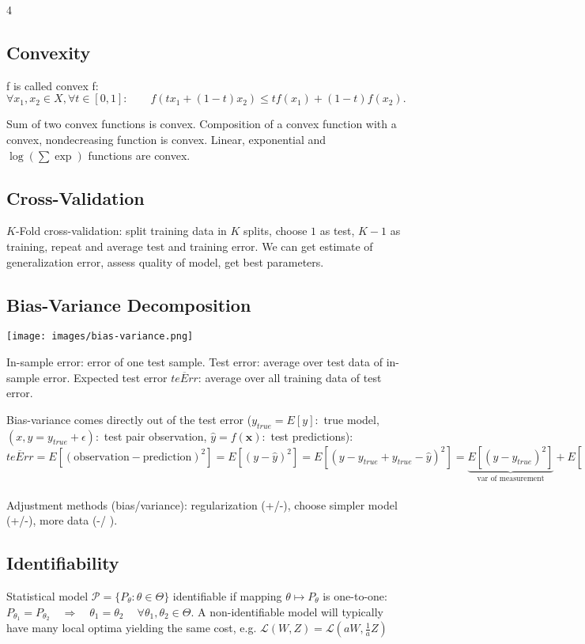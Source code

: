 \documentclass[10pt,a4paper,landscape]{extarticle}
\renewcommand{\bf}[1]{\ensuremath{\mathbf{#1}}}
\begin{document}
\begin{multicols*}{4}
\subsection{Convexity}
f is called convex f: $\forall x_1, x_2 \in X, \forall t \in [0, 1]: \qquad f(tx_1+(1-t)x_2)\leq t f(x_1)+(1-t)f(x_2).$

Sum of two convex functions is convex. Composition of a convex function with a convex, nondecreasing function is convex. Linear, exponential and $\log(\sum \exp)$ functions are convex.

\subsection{Cross-Validation}
$K$-Fold cross-validation: split training data in $K$ splits, choose $1$ as test, $K-1$ as training, repeat and average test and training error. We can get estimate of generalization error, assess quality of model, get best parameters.

\subsection{Bias-Variance Decomposition}
\begin{colfig}
  \centering
  \texttt{[image: images/bias-variance.png]}
\end{colfig}

In-sample error: error of one test sample. Test error: average over test data of in-sample error. Expected test error $\overline{teErr}$: average over all training data of test error. 

Bias-variance comes directly out of the test error ($y_{true}=E[y]:$ true model, $(x,y = y_{true} + \epsilon):$ test pair observation, $\hat{y}=f(\bf{x}):$ test predictions):
$\overline{teErr} 
= E[(\text{observation} - \text{prediction})^2] = E[(y - \hat{y})^2]
= E[(y - y_{true} + y_{true} - \hat{y})^2]
=\underbrace{E[(y - y_{true})^2]}_{\text{var of measurement}} + E[(y_{true} - \hat{y})^2]
=\sigma^2 + E[(y_{true} - E[\hat{y}] + E[\hat{y}] - \hat{y})^2]
=\sigma^2 + \underbrace{E[(y_{true} - E[\hat{y}])^2]}_{\text{pred bias}^2} +\underbrace{E[(E[\hat{y}] - \hat{y})^2]}_{\text{pred variance}}
$

Adjustment methods (bias/variance): regularization (+/-), choose simpler model (+/-), more data (-/ ).

\subsection{Identifiability}
Statistical model $\mathcal{P} = \{P_\theta: \theta \in \Theta\}$ identifiable if mapping $\theta \mapsto P_\theta$ is one-to-one:
$P_{\theta_1}=P_{\theta_2} \quad\Rightarrow\quad \theta_1=\theta_2 \quad\ \forall \theta_1,\theta_2\in\Theta.$
A non-identifiable model will typically have many local optima yielding the same cost, e.g. $\mathcal{L}(W, Z) = \mathcal{L}(aW, \frac{1}{a} Z)$


\end{multicols*}
\end{document}
